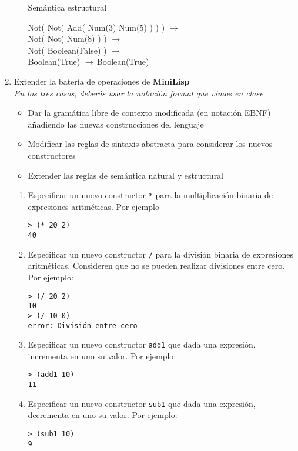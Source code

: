 \documentclass{article}
\newcommand{\raa}{$\rightarrow$\;\,}
\newenvironment{ttt}{\par\ttfamily}{\par}
\begin{document}
\begin{enumerate}
\begin{enumerate}
          Semántica estructural
          \begin{ttt}
            Not( Not( Add( Num(3) Num(5) ) ) ) \raa\\
            Not( Not( Num(8) ) ) \raa\\
            Not( Boolean(False) ) \raa\\
            Boolean(True) \raa Boolean(True)
          \end{ttt}

      \end{enumerate}

    \item Extender la batería de operaciones de \textbf{MiniLisp}\\
      \textit{En los tres casos, deberás usar la notación formal que vimos en clase}
      \begin{itemize}
        \item Dar la gramática libre de contexto modificada (en notación EBNF) añadiendo las nuevas construcciones del lenguaje
        \item Modificar las reglas de sintaxis abstracta para considerar los nuevos constructores
        \item Extender las reglas de semántica natural y estructural 
      \end{itemize}
      \begin{enumerate}
        \item Especificar un nuevo constructor \texttt{*} para la multiplicación binaria de expresiones aritméticas. Por ejemplo
          \begin{verbatim}
> (* 20 2)
40
          \end{verbatim}

        \item Especificar un nuevo constructor \texttt{/} para la división binaria de expresiones aritméticas. Consideren que no se pueden realizar divisiones entre cero. Por ejemplo:
          \begin{verbatim}
> (/ 20 2)
10
> (/ 10 0)
error: División entre cero
          \end{verbatim}

        \item Especificar un nuevo constructor \texttt{add1} que dada una expresión, incrementa en uno su valor. Por ejemplo:
          \begin{verbatim}
> (add1 10)
11
          \end{verbatim}

        \item Especificar un nuevo constructor \texttt{sub1} que dada una expresión, decrementa en uno su valor. Por ejemplo:
          \begin{verbatim}
> (sub1 10)
9
          \end{verbatim}


\end{enumerate}
\end{enumerate}
\end{document}

